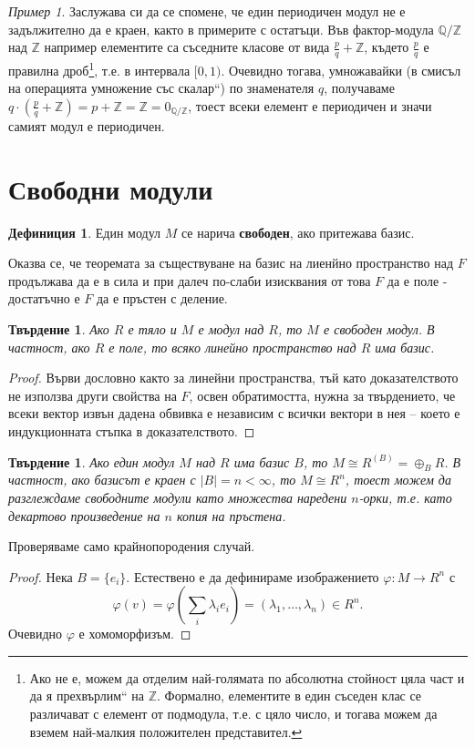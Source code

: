 \documentclass{article}
\newif\ifusemulticols
\newcommand\newterm[1]{\textbf{#1}}
\theoremstyle{definition}
\newtheorem{deff}{Дефиниция}
\theoremstyle{remark}
\newtheorem{example}{Пример}[section]
\theoremstyle{plain}
\theoremstyle{plain}
\newtheorem{prop}[theorem]{Твърдение}
\newenvironment{mymulticols}
    { \ifusemulticols \begin{multicols}{2} \fi }
    { \ifusemulticols \end{multicols} \fi }
\newcommand{\Z}{\mathbb{Z}}
\begin{document}
\begin{mymulticols}
\begin{example}
    Заслужава си да се спомене, че един периодичен модул не е задължително да е краен, както в
    примерите с остатъци.  Във фактор-модула $\mathbb Q / \Z$ над $\Z$ например елементите са
    съседните класове от вида $\frac{p}{q} + \Z$, където $\frac{p}{q}$ е правилна дроб\footnote{Ако
    не е, можем да отделим най-голямата по абсолютна стойност цяла част и да я \quotedblbase
    прехвърлим`` на $\Z$. Формално, елементите в един съседен клас се различават с елемент от
    подмодула, т.е. с цяло число, и тогава можем да вземем най-малкия положителен представител.},
    т.е. в интервала $[0, 1)$.  Очевидно тогава, умножавайки (в смисъл на операцията \quotedblbase
    умножение със скалар``) по знаменателя $q$, получаваме $q \cdot (\frac{p}{q} + \Z) = p + \Z = \Z
    = 0_{\mathbb Q / \Z}$, тоест всеки елемент е периодичен и значи самият модул е периодичен.
\end{example}

\section{Свободни модули}%
\label{sec:свободни_модули}

\begin{deff}
    Един модул $M$ се нарича \newterm{свободен}, ако притежава базис.
\end{deff}

Оказва се, че теоремата за съществуване на базис на лиенйно пространство над $F$ продължава да е в
сила и при далеч по-слаби изисквания от това $F$ да е поле - достатъчно е $F$ да е пръстен с
деление.
\begin{prop}
    Ако $R$ е тяло и $M$ е модул над $R$, то $M$ е свободен модул.
    В частност, ако $R$ е поле, то всяко линейно пространство над $R$ има базис.
\end{prop}
\begin{proof}
    Върви дословно както за линейни пространства, тъй като доказателството не използва други
    свойства на $F$, освен обратимостта, нужна за твърдението, че всеки вектор извън дадена обвивка
    е независим с всички вектори в нея -- което е индукционната стъпка в доказателството.
\end{proof}

\begin{prop}
    \label{prop:free_form}
    Ако един модул $M$ над $R$ има базис $B$, то $M \cong R^{(B)} = \oplus_B R$.
    В частност, ако базисът е краен с $|B| = n < \infty$, то $M \cong R^n$, тоест можем да
    разглеждаме свободните модули като множества наредени $n$-орки, т.е. като декартово произведение
    на $n$ копия на пръстена.
\end{prop}
Проверяваме само крайнопородения случай.
\begin{proof}
    Нека $B = \{e_i\}$. Естествено е да дефинираме изображението ${\varphi : M \to R^n}$ с
    $$\varphi(v) = \varphi\left(\sum_i \lambda_i e_i\right) = \left( \lambda_1, \ldots, \lambda_n \right) \in
    R^n.$$ Очевидно $\varphi$ е хомоморфизъм.


\end{proof}
\end{mymulticols}
\end{document}
